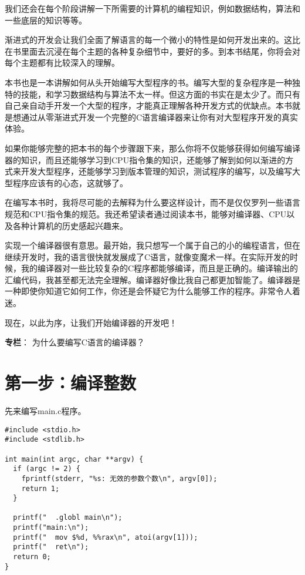 \documentclass[cn,10pt,math=newtx,citestyle=gb7714-2015,bibstyle=gb7714-2015]{elegantbook}
\begin{document}
我们还会在每个阶段讲解一下所需要的计算机的编程知识，例如数据结构，算法和一些底层的知识等等。

渐进式的开发会让我们全面了解语言的每一个微小的特性是如何开发出来的。这比在书里面去沉浸在每个主题的各种复杂细节中，要好的多。到本书结尾，你将会对每个主题都有比较深入的理解。

本书也是一本讲解如何从头开始编写大型程序的书。编写大型的复杂程序是一种独特的技能，和学习数据结构与算法不太一样。但这方面的书实在是太少了。而只有自己亲自动手开发一个大型的程序，才能真正理解各种开发方式的优缺点。本书就是想通过从零渐进式开发一个完整的C语言编译器来让你有对大型程序开发的真实体验。

如果你能够完整的把本书的每个步骤跟下来，那么你将不仅能够获得如何编写编译器的知识，而且还能够学习到CPU指令集的知识，还能够了解到如何以渐进的方式来开发大型程序，还能够学习到版本管理的知识，测试程序的编写，以及编写大型程序应该有的心态，这就够了。

在编写本书时，我将尽可能的去解释为什么要这样设计，而不是仅仅罗列一些语言规范和CPU指令集的规范。我还希望读者通过阅读本书，能够对编译器、CPU以及各种计算机的历史感起兴趣来。

实现一个编译器很有意思。最开始，我只想写一个属于自己的小的编程语言，但在继续开发时，我的语言很快就发展成了C语言，就像变魔术一样。在实际开发的时候，我的编译器对一些比较复杂的C程序都能够编译，而且是正确的。编译输出的汇编代码，我甚至都无法完全理解。编译器好像比我自己都更加智能了。编译器是一种即使你知道它如何工作，你还是会怀疑它为什么能够工作的程序。非常令人着迷。

现在，以此为序，让我们开始编译器的开发吧！

\begin{tcolorbox}
    \textbf{专栏}： 为什么要编写C语言的编译器？


\end{tcolorbox}

\chapter{第一步：编译整数}

先来编写main.c程序。

\begin{verbatim}
#include <stdio.h>
#include <stdlib.h>

int main(int argc, char **argv) {
  if (argc != 2) {
    fprintf(stderr, "%s: 无效的参数个数\n", argv[0]);
    return 1;
  }

  printf("  .globl main\n");
  printf("main:\n");
  printf("  mov $%d, %%rax\n", atoi(argv[1]));
  printf("  ret\n");
  return 0;
}
\end{verbatim}
\end{document}
